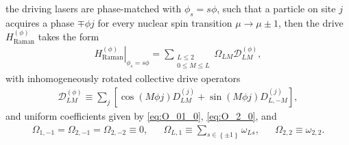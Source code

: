 \documentclass[nofootinbib,notitlepage,11pt]{revtex4-2}
\renewcommand{\t}{\text} %
\newcommand{\p}[1]{\left(#1\right)} %
\renewcommand{\sp}[1]{\left[#1\right]} %
\renewcommand{\set}[1]{\left\{#1\right\}} %
\newcommand{\1}{\mathds{1}}
\newcommand{\D}{\mathcal{D}}
\begin{document}
the driving lasers are phase-matched with $\phi_s=s\phi$, such that a
particle on site $j$ acquires a phase $\mp\phi j$ for every nuclear
spin transition $\mu\to\mu\pm1$, then the drive
$H_{\t{Raman}}^{(\phi)}$ takes the form
\begin{align}
  \left. H_{\t{Raman}}^{(\phi)} \right|_{\phi_s=s\phi}
  = \sum_{\substack{L\le2\\0\le M\le L}} \Omega_{LM} \D_{LM}^{(\phi)},
\end{align}
with inhomogeneously rotated collective drive operators
\begin{align}
  \D_{LM}^{(\phi)}
  \equiv \sum_j \sp{\cos\p{M\phi j} D_{LM}^{(j)}
    + \sin\p{M\phi j} D_{L,-M}^{(j)}},
\end{align}
and uniform coefficients given by \eqref{eq:O_01_0}, \eqref{eq:O_2_0},
and
\begin{align}
  \Omega_{1,-1} = \Omega_{2,-1} = \Omega_{2,-2} \equiv 0,
  &&
  \Omega_{L,1} \equiv \sum_{s\in\set{\pm1}} \omega_{Ls},
  &&
  \Omega_{2,2} \equiv \omega_{2,2}.
\end{align}




\end{document}
